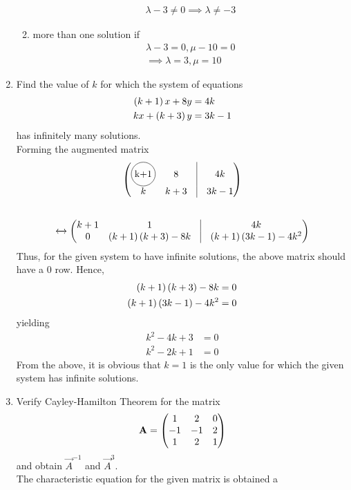 \documentclass[journal,12pt,twocolumn]{IEEEtran}
\renewcommand\thesection{\arabic{section}}
\begin{document}
\begin{enumerate}[label=\thesection.\arabic*.,ref=\thesection.\theenumi]
\begin{enumerate}
\begin{align}
	\lambda -3 \ne 0 \implies \lambda \ne -3 
  \end{align}
			\item more than one solution if 
\begin{align}
	\lambda -3 = 0, \mu - 10 = 0
	\\
 \implies 
	\lambda =3, \mu = 10
  \end{align}
				\end{enumerate}
			\item Find the value of $k$ for which the system of equations
\begin{align}
	\left(k+1\right)x+8y &= 4k
	\\
	kx+\left(k+3\right)y &= 3k-1
\end{align}
has infinitely many solutions.
\\
\solution Forming the augmented matrix 
\begin{align}
	\myvec{\circled{k+1} & 8 & \vrule &  4k\\ k & k+3 & \vrule & 3k-1}
  \end{align}
  {\tiny
\begin{align}
	\\
	\xleftrightarrow[]{}
	\myvec{k+1 & 1 & \vrule &  4k\\ 0 & \brak{k+1}\brak{k+3}-8k & \vrule & \brak{k+1}\brak{3k-1}-4k^2}
  \end{align}
  }
  Thus, for the given system to have infinite solutions, the above matrix should have a 0 row.  Hence, 
\begin{align}
	\left(k+1\right)\left(k+3\right)-8k & = 0
	\\
	\left(k+1\right)\left(3k-1\right)-4k^2 &=0
  \end{align}
  yielding 
\begin{align}
	k^2 -4k +3 &= 0
	\\
	k^2 -2k +1  &= 0
  \end{align}
  From the above, it is obvious that $k = 1$ is the only value for which the given system has infinite solutions.
\item Verify Cayley-Hamilton Theorem for the matrix 
\begin{align}
	\mathbf{A} = 	\begin{pmatrix}1 & 2 & 0\\-1 & -1 & 2 \\ 1 & 2 & 1\end{pmatrix}
\end{align}
		and obtain $\vec{A}^{-1}$ and $\vec{A}^{3}$.
		\\
		\solution The characteristic equation for the given matrix is obtained a
\begin{align}

\end{align}
\end{enumerate}
\end{document}
